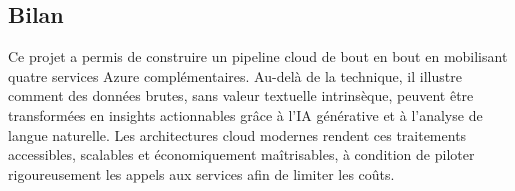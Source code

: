 \documentclass[12pt, a4paper]{article}
\begin{document}
\subsection{Bilan}

Ce projet a permis de construire un pipeline cloud de bout en bout en mobilisant quatre services Azure complémentaires. Au-delà de la technique, il illustre comment des données brutes, sans valeur textuelle intrinsèque, peuvent être transformées en insights actionnables grâce à l'IA générative et à l'analyse de langue naturelle. Les architectures cloud modernes rendent ces traitements accessibles, scalables et économiquement maîtrisables, à condition de piloter rigoureusement les appels aux services afin de limiter les coûts.

\end{document}
